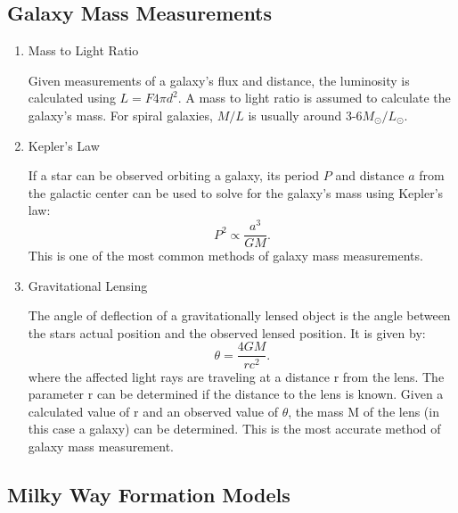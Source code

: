 \subsection{Galaxy Mass Measurements}

\begin{enumerate}
\item Mass to Light Ratio

Given measurements of a galaxy's flux and distance, the luminosity is calculated using $L=F 4\pi d^2$. A mass to light ratio is assumed to calculate the galaxy's mass. For spiral galaxies, $M/L$ is usually around 3-6$M_\odot/L_\odot$.

\item Kepler's Law

If a star can be observed orbiting a galaxy, its period $P$ and distance $a$ from the galactic center can be used to solve for the galaxy's mass using Kepler's law:
\begin{equation}
P^2 \propto \frac{a^3}{GM}.
\end{equation}
This is one of the most common methods of galaxy mass measurements. 

\item Gravitational Lensing

The angle of deflection of a gravitationally lensed object is the angle between the stars actual position and the observed lensed position. It is given by:
\begin{equation}
\theta = \frac{4GM}{rc^2}.
\end{equation}
where the affected light rays are traveling at a distance r from the lens. The parameter r can be determined if the distance to the lens is known. Given a calculated value of r and an observed value of $\theta$, the mass M of the lens (in this case a galaxy) can be determined. This is the most accurate method of galaxy mass measurement.

\end{enumerate}

\subsection{Milky Way Formation Models}

